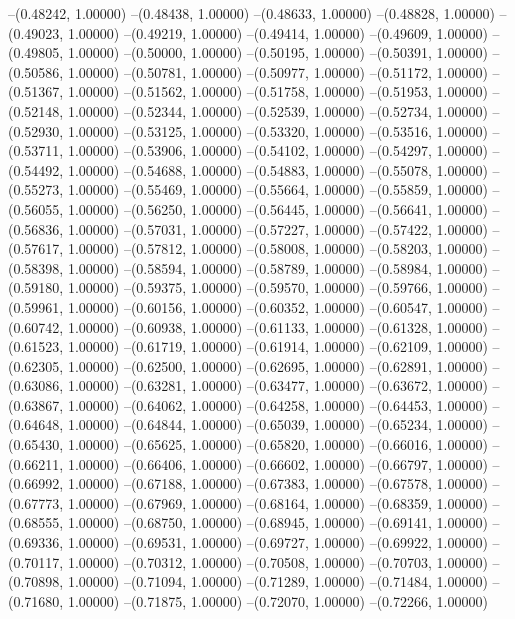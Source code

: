 --(0.48242, 1.00000)
--(0.48438, 1.00000)
--(0.48633, 1.00000)
--(0.48828, 1.00000)
--(0.49023, 1.00000)
--(0.49219, 1.00000)
--(0.49414, 1.00000)
--(0.49609, 1.00000)
--(0.49805, 1.00000)
--(0.50000, 1.00000)
--(0.50195, 1.00000)
--(0.50391, 1.00000)
--(0.50586, 1.00000)
--(0.50781, 1.00000)
--(0.50977, 1.00000)
--(0.51172, 1.00000)
--(0.51367, 1.00000)
--(0.51562, 1.00000)
--(0.51758, 1.00000)
--(0.51953, 1.00000)
--(0.52148, 1.00000)
--(0.52344, 1.00000)
--(0.52539, 1.00000)
--(0.52734, 1.00000)
--(0.52930, 1.00000)
--(0.53125, 1.00000)
--(0.53320, 1.00000)
--(0.53516, 1.00000)
--(0.53711, 1.00000)
--(0.53906, 1.00000)
--(0.54102, 1.00000)
--(0.54297, 1.00000)
--(0.54492, 1.00000)
--(0.54688, 1.00000)
--(0.54883, 1.00000)
--(0.55078, 1.00000)
--(0.55273, 1.00000)
--(0.55469, 1.00000)
--(0.55664, 1.00000)
--(0.55859, 1.00000)
--(0.56055, 1.00000)
--(0.56250, 1.00000)
--(0.56445, 1.00000)
--(0.56641, 1.00000)
--(0.56836, 1.00000)
--(0.57031, 1.00000)
--(0.57227, 1.00000)
--(0.57422, 1.00000)
--(0.57617, 1.00000)
--(0.57812, 1.00000)
--(0.58008, 1.00000)
--(0.58203, 1.00000)
--(0.58398, 1.00000)
--(0.58594, 1.00000)
--(0.58789, 1.00000)
--(0.58984, 1.00000)
--(0.59180, 1.00000)
--(0.59375, 1.00000)
--(0.59570, 1.00000)
--(0.59766, 1.00000)
--(0.59961, 1.00000)
--(0.60156, 1.00000)
--(0.60352, 1.00000)
--(0.60547, 1.00000)
--(0.60742, 1.00000)
--(0.60938, 1.00000)
--(0.61133, 1.00000)
--(0.61328, 1.00000)
--(0.61523, 1.00000)
--(0.61719, 1.00000)
--(0.61914, 1.00000)
--(0.62109, 1.00000)
--(0.62305, 1.00000)
--(0.62500, 1.00000)
--(0.62695, 1.00000)
--(0.62891, 1.00000)
--(0.63086, 1.00000)
--(0.63281, 1.00000)
--(0.63477, 1.00000)
--(0.63672, 1.00000)
--(0.63867, 1.00000)
--(0.64062, 1.00000)
--(0.64258, 1.00000)
--(0.64453, 1.00000)
--(0.64648, 1.00000)
--(0.64844, 1.00000)
--(0.65039, 1.00000)
--(0.65234, 1.00000)
--(0.65430, 1.00000)
--(0.65625, 1.00000)
--(0.65820, 1.00000)
--(0.66016, 1.00000)
--(0.66211, 1.00000)
--(0.66406, 1.00000)
--(0.66602, 1.00000)
--(0.66797, 1.00000)
--(0.66992, 1.00000)
--(0.67188, 1.00000)
--(0.67383, 1.00000)
--(0.67578, 1.00000)
--(0.67773, 1.00000)
--(0.67969, 1.00000)
--(0.68164, 1.00000)
--(0.68359, 1.00000)
--(0.68555, 1.00000)
--(0.68750, 1.00000)
--(0.68945, 1.00000)
--(0.69141, 1.00000)
--(0.69336, 1.00000)
--(0.69531, 1.00000)
--(0.69727, 1.00000)
--(0.69922, 1.00000)
--(0.70117, 1.00000)
--(0.70312, 1.00000)
--(0.70508, 1.00000)
--(0.70703, 1.00000)
--(0.70898, 1.00000)
--(0.71094, 1.00000)
--(0.71289, 1.00000)
--(0.71484, 1.00000)
--(0.71680, 1.00000)
--(0.71875, 1.00000)
--(0.72070, 1.00000)
--(0.72266, 1.00000)
